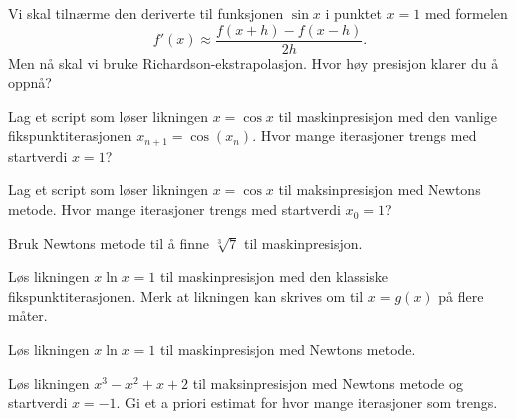 \documentclass[a4paper,norsk,11pt]{interaktiv}
\begin{document}
\begin{oppgave}{4}
Vi skal tilnærme den deriverte til funksjonen $\sin x$ i punktet $x=1$ med formelen 
\begin{equation*}
f'(x) \approx \frac{f(x+h)-f(x-h)}{2h}.
\end{equation*} 
Men nå skal vi bruke Richardson-ekstrapolasjon. 
Hvor høy presisjon klarer du å oppnå?
\end{oppgave}


\begin{oppgave}{5}
Lag et script som løser likningen $x=\cos x$ til maskinpresisjon med den vanlige fikspunktiterasjonen $x_{n+1}=\cos(x_n)$. Hvor mange iterasjoner trengs med startverdi $x=1$?
\end{oppgave}

\begin{oppgave}{6}
Lag et script som løser likningen $x=\cos x$ til maksinpresisjon med Newtons metode. Hvor mange iterasjoner trengs med startverdi $x_0=1$?
\end{oppgave}


\begin{oppgave}{7}
Bruk Newtons metode til å finne $\sqrt[3]{7}$ til maskinpresisjon. 
\end{oppgave}



\begin{oppgave}{8}
Løs likningen $x \ln x=1$ til maskinpresisjon med den klassiske fikspunktiterasjonen. 
Merk at likningen kan skrives om til $x=g(x)$ på flere måter.
\end{oppgave}

\begin{oppgave}{9}
Løs likningen $x \ln x=1$ til maskinpresisjon med Newtons metode. 
\end{oppgave}

\begin{oppgave}{10}
Løs likningen $x^3-x^2+x+2$ til maksinpresisjon med Newtons metode og startverdi $x=-1$. Gi et a priori estimat for hvor mange iterasjoner som trengs.
\end{oppgave}
\end{document}
